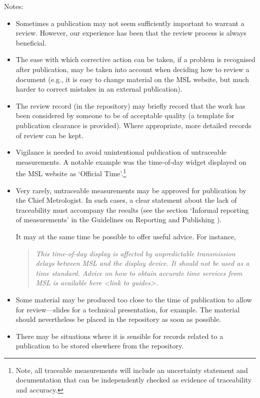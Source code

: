 Notes: 
\begin{itemize}
\item Sometimes a publication may not seem sufficiently important to warrant a review. However, our experience has been that the review process is always beneficial.   
\item  The ease with which corrective action can be taken, if a problem is recognised after publication, may be taken into account when deciding how to review a document (e.g., it is easy to change material on the MSL website, but much harder to correct mistakes in an external publication). 
\item The review record  (in the repository) may briefly record that the work has been considered by someone to be of acceptable quality (a template for publication clearance is provided). Where appropriate, more detailed records of review can be kept.
\item  Vigilance is needed to avoid unintentional publication of untraceable measurements. A notable example was the time-of-day widget displayed on the MSL website as `Official Time'.\footnote{Note, all traceable measurements will include an uncertainty statement and documentation that can be independently checked as evidence of traceability and accuracy.}
\item  Very rarely, untraceable measurements may be approved for publication by the Chief Metrologist. In such cases, a clear statement about the lack of traceability must accompany the results (see the section `Informal reporting of measurements' in the Guidelines on Reporting and Publishing \cite[\S\ref*{GRP-ss:informal_reporting}]{MSL_Reporting_Guidelines}). 

It may at the same time be possible to offer useful advice. For instance, 
\begin{quote}\textit{%
This time-of-day display is affected by unpredictable transmission delays between MSL and the display device. It should not be used as a time standard. Advice on how to obtain accurate time services from MSL is available here <link to guides>.
}\end{quote} 
\item  Some material may be produced too close to the time of publication to allow for review---slides for a technical presentation, for example. The material should nevertheless be placed in the repository as soon as possible.
\item  There may be situations where it is sensible for records related to a publication to be stored elsewhere from the repository.   
\end{itemize}

